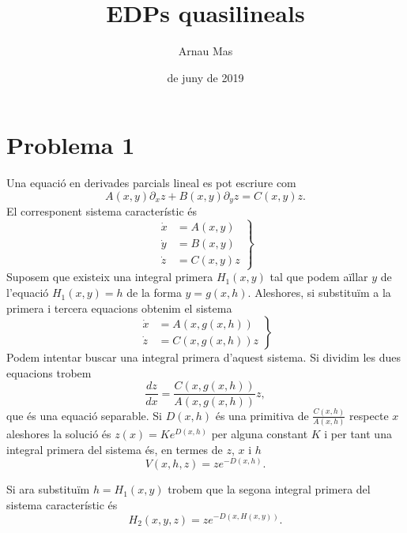 \documentclass[12pt]{article}
\title{\sffamily {\bfseries Seminari 3:} {\sffamily EDPs quasilineals}}
\author{\sffamily Arnau Mas}
\date{\sffamily 6 de juny de 2019}
\numberwithin{table}{section}
\numberwithin{equation}{section}
\numberwithin{figure}{section}
\begin{document}
\maketitle

\addtocounter{section}{1}
\section*{Problema 1}
Una equació en derivades parcials lineal es pot escriure com 
\begin{equation*}
	A(x,y) \partial_x z + B(x,y) \partial_y z = C(x,y)z.
\end{equation*}
El corresponent sistema característic és
\begin{equation*}
	\left. 	
		\begin{aligned}
			\dot{x} & = A(x,y) \\
			\dot{y} & = B(x,y) \\
			\dot{z} & = C(x,y)z
		\end{aligned}
	\right\}
\end{equation*}
Suposem que existeix una integral primera \( H_1(x,y) \) tal que podem aïllar \( y \) de l'equació \( H_1(x,y) = h \) de la forma \( y = g(x,h) \). Aleshores, si substituïm a la primera i tercera equacions obtenim el sistema
\begin{equation*}
	\left. 	
		\begin{aligned}
			\dot{x} & = A(x,g(x,h)) \\
			\dot{z} & = C(x,g(x,h))z
		\end{aligned}
	\right\}
\end{equation*}
Podem intentar buscar una integral primera d'aquest sistema. Si dividim les dues equacions trobem
\begin{equation*}
	\frac{dz}{dx} = \frac{C(x,g(x,h))}{A(x, g(x,h))}z,
\end{equation*}
que és una equació separable. Si \( D(x,h) \) és una primitiva de \( \frac{C(x,h)}{A(x,h)} \) respecte \( x \) aleshores la solució és \( z(x) = K e^{D(x,h)} \) per alguna constant \( K \) i per tant una integral primera del sistema és, en termes de \( z \), \( x \) i \( h \)
\begin{equation*}
	V(x,h,z) = z e^{-D(x,h)}.
\end{equation*}

Si ara substituïm \( h = H_1(x,y) \) trobem que la segona integral primera del sistema característic és
\begin{equation*}
	H_2(x,y,z) = z e^{-D(x,H(x,y))}.
\end{equation*}
\end{document}
